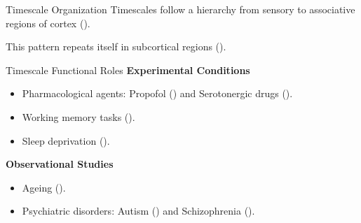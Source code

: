 \documentclass[12pt]{beamer}
\begin{document}
\begin{frame}{Timescale Organization}
\footnotesize
Timescales follow a hierarchy from sensory to associative regions of cortex (\cite{murray_hierarchy_2014}).

This pattern repeats itself in subcortical regions (\cite{raut_hierarchical_2020, muller_core_2020, nougaret_intrinsic_2021}).
\end{frame}

\begin{frame}{Timescale Functional Roles}
\footnotesize
\textbf{Experimental Conditions}
\begin{itemize}
    \item Pharmacological agents: Propofol (\cite{huang_timescales_2018}) and Serotonergic drugs (\cite{shinn_functional_2023}).
    \item Working memory tasks (\cite{gao_neuronal_2020}).
    \item Sleep deprivation (\cite{meisel_decline_2017}).
\end{itemize}
\vspace{0.25cm}
\textbf{Observational Studies}
\begin{itemize}
    \item Ageing (\cite{gao_neuronal_2020}).
    \item Psychiatric disorders: Autism (\cite{watanabe_atypical_2019}) and Schizophrenia (\cite{wengler_distinct_2020}).
\end{itemize}
\end{frame}
\end{document}
